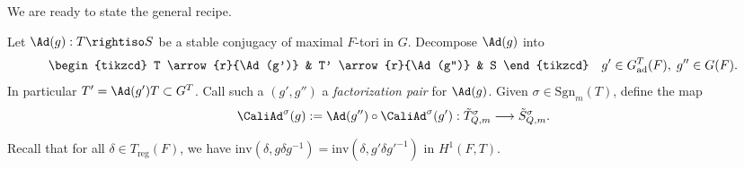 \documentclass[a4paper,10pt]{article}
\begin{document}
We are ready to state the general recipe.
\begin{definition}\label{def:st-conj}
	Let $\Ad(g): T \rightiso S$ be a stable conjugacy of maximal $F$-tori in $G$. Decompose $\Ad(g)$ into
	\[\begin{tikzcd}
		T \arrow{r}{\Ad(g')} & T' \arrow{r}{\Ad(g'')} & S
	\end{tikzcd} \quad g' \in G^T_\mathrm{ad}(F), \; g'' \in G(F). \]
	In particular $T' = \Ad(g')T \subset G^T$. Call such a $(g',g'')$ a \emph{factorization pair} for $\Ad(g)$. Given $\sigma \in \mathrm{Sgn}_m(T)$, define the map
	\begin{gather*}
		\CaliAd^\sigma(g) := \Ad(g'') \circ \CaliAd^\sigma(g'): \tilde{T}^\sigma_{Q,m} \longrightarrow \tilde{S}^\sigma_{Q,m}.
	\end{gather*}
\end{definition}
Recall that for all $\delta \in T_\text{reg}(F)$, we have $\text{inv}(\delta, g\delta g^{-1}) = \text{inv}(\delta, g' \delta g'^{-1})$ in $H^1(F,T)$.
\end{document}
